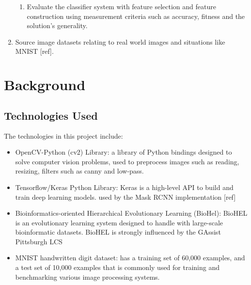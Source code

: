\begin{enumerate}
\begin{enumerate}
		\item Evaluate the classifier system with feature selection and feature construction using measurement criteria such as accuracy, fitness and the solution's generality.
	\end{enumerate}
	\item Source image datasets relating to real world images and situations like MNIST [ref].
	
\end{enumerate}
\chapter{Background}
\section{Technologies Used}
The technologies in this project include:
\begin{itemize}
\item OpenCV-Python (cv2) Library: a library of Python bindings designed to solve computer vision problems, used to preprocess images such as reading, resizing, filters such as canny and low-pass. 
\item Tensorflow/Keras Python Library: Keras is a high-level API to build and train deep learning models. used by the Mask RCNN implementation [ref]
\item Bioinformatics-oriented Hierarchical Evolutionary Learning (BioHel): BioHEL is an evolutionary learning system designed to handle with large-scale bioinformatic datasets. BioHEL is strongly influenced by the GAssist Pittsburgh LCS
\item MNIST handwritten digit dataset: has a training set of 60,000 examples, and a test set of 10,000 examples  that is commonly used for training and benchmarking various image processing systems.
\end{itemize}

